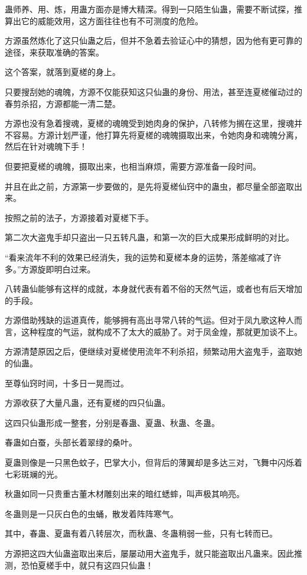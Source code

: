 \begin{this_body}
蛊师养、用、炼，用蛊方面亦是博大精深。得到一只陌生仙蛊，需要不断试探，推算出它的威能效用，这方面往往也有不可测度的危险。

方源虽然炼化了这只仙蛊之后，但并不急着去验证心中的猜想，因为他有更可靠的途径，来获取准确的答案。

这个答案，就落到夏槎的身上。

只要搜刮她的魂魄，方源不仅能获知这只仙蛊的身份、用法，甚至连夏槎催动过的春剪杀招，方源都能一清二楚。

方源也没有急着搜魂，夏槎的魂魄受到她肉身的保护，八转修为搁在这里，搜魂并不容易。方源计划严谨，他打算先将夏槎的魂魄摄取出来，令她肉身和魂魄分离，然后在针对魂魄下手！

但要把夏槎的魂魄，摄取出来，也相当麻烦，需要方源准备一段时间。

并且在此之前，方源第一步要做的，是先将夏槎仙窍中的蛊虫，都尽量全部盗取出来。

按照之前的法子，方源接着对夏槎下手。

第二次大盗鬼手却只盗出一只五转凡蛊，和第一次的巨大成果形成鲜明的对比。

“看来流年不利的效果已经消失，我的运势和夏槎本身的运势，落差缩减了许多。”方源旋即明白过来。

八转蛊仙能够有这样的成就，本身就代表有着不俗的天然气运，或者也有后天增加的手段。

方源借助残缺的运道真传，能够拥有高出寻常八转的气运。但对于凤九歌这种人而言，这种程度的气运，就构成不了太大的威胁了。对于凤金煌，那就更加谈不上。

方源清楚原因之后，便继续对夏槎使用流年不利杀招，频繁动用大盗鬼手，盗取她的仙蛊。

至尊仙窍时间，十多日一晃而过。

方源收获了大量凡蛊，还有夏槎的四只仙蛊。

这四只仙蛊形成一整套，分别是春蛊、夏蛊、秋蛊、冬蛊。

春蛊如白蚕，头部长着翠绿的桑叶。

夏蛊则像是一只黑色蚊子，巴掌大小，但背后的薄翼却是多达三对，飞舞中闪烁着七彩斑斓的光。

秋蛊如同一只贵重古董木材雕刻出来的暗红蟋蟀，叫声极其响亮。

冬蛊则是一只灰白色的虫蛹，散发着阵阵寒气。

其中，春蛊、夏蛊有着八转层次，而秋蛊、冬蛊稍弱一些，只有七转而已。

方源把这四大仙蛊盗取出来后，屡屡动用大盗鬼手，就只能盗取出凡蛊来。因此推测，恐怕夏槎手中，就只有这四只仙蛊！


\end{this_body}
